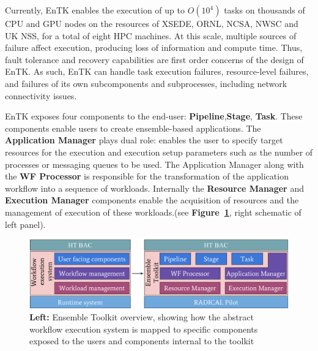 Currently, EnTK enables the execution of up to \(O(10^4)\) tasks on thousands
of CPU and GPU nodes on the resources of XSEDE, ORNL, NCSA, NWSC and UK NSS,
for a total of eight HPC machines. At this scale, multiple sources of failure
affect execution, producing loss of information and compute time. Thus, fault
tolerance and recovery capabilities are first order concerns of the design of
EnTK\@. As such, EnTK can handle task execution failures, resource-level
failures, and failures of its own subcomponents and subprocesses, including
network connectivity issues.

EnTK exposes four components to the end-user: \textbf{Pipeline},\textbf{Stage},
\textbf{Task}. These components enable users to create ensemble-based 
applications. The \textbf{Application Manager} plays dual role: enables the user
to specify target resources for the execution and execution setup 
parameters such as the number of processes or messaging queues to be used. The 
Application Manager along with the  \textbf{WF Processor} is responsible for the
transformation of the application workflow into a sequence of workloads. 
Internally the \textbf{Resource Manager} and \textbf{Execution Manager} 
components enable the acquisition of resources and the management of execution 
of these workloads.(see \textbf{Figure~\ref{fig:entk_arch}}, right schematic of
left panel).

\begin{figure}[!htbp]
  \begin{minipage}[b]{0.49\textwidth}
  \centering
  \includegraphics[width=\textwidth]{FIGURES/entk_overview.pdf}
  \end{minipage}
  \caption{\textbf{Left:} Ensemble Toolkit overview, showing how the abstract
           workflow execution system is mapped to specific components exposed
           to the users and components internal to the toolkit
           }\label{fig:entk_arch}
\end{figure}

